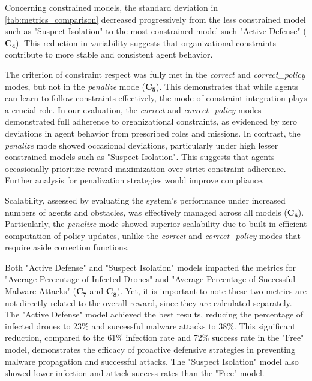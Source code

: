 Concerning constrained models, the standard deviation in \autoref{tab:metrics_comparison} decreased progressively from the less constrained model such as "Suspect Isolation" to the most constrained model such "Active Defense" ($\mathbf{C_4}$). This reduction in variability suggests that organizational constraints contribute to more stable and consistent agent behavior.

The criterion of constraint respect was fully met in the \textit{correct} and \textit{correct\_policy} modes, but not in the \textit{penalize} mode ($\mathbf{C_5}$). This demonstrates that while agents can learn to follow constraints effectively, the mode of constraint integration plays a crucial role. In our evaluation, the \textit{correct} and \textit{correct\_policy} modes demonstrated full adherence to organizational constraints, as evidenced by zero deviations in agent behavior from prescribed roles and missions. In contrast, the \textit{penalize} mode showed occasional deviations, particularly under high lesser constrained models such as "Suspect Isolation". This suggests that agents occasionally prioritize reward maximization over strict constraint adherence. Further analysis for penalization strategies would improve compliance.

Scalability, assessed by evaluating the system's performance under increased numbers of agents and obstacles, was effectively managed across all models ($\mathbf{C_6}$). Particularly, the \textit{penalize} mode showed superior scalability due to built-in efficient computation of policy updates, unlike the \textit{correct} and \textit{correct\_policy} modes that require aside correction functions.

Both "Active Defense" and "Suspect Isolation" models impacted the metrics for "Average Percentage of Infected Drones" and "Average Percentage of Successful Malware Attacks" ($\mathbf{C_7}$ and $\mathbf{C_8}$). Yet, it is important to note these two metrics are not directly related to the overall reward, since they are calculated separately. The "Active Defense" model achieved the best results, reducing the percentage of infected drones to 23\% and successful malware attacks to 38\%. This significant reduction, compared to the 61\% infection rate and 72\% success rate in the "Free" model, demonstrates the efficacy of proactive defensive strategies in preventing malware propagation and successful attacks. The "Suspect Isolation" model also showed lower infection and attack success rates than the "Free" model.

